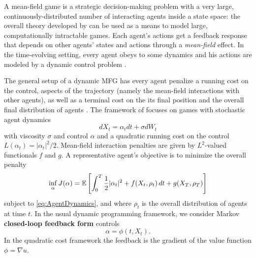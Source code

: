 \documentclass[../report.tex]{subfiles}
\begin{document}
A mean-field game \cite{LASRY2006619,LASRY2006679} is a strategic decision-making problem with a very large, continuously-distributed number of interacting agents inside a state space: the overall theory developed by \citeauthor{LASRY2006619} can be used as a means to model large, computationally intractable games. Each agent's actions get a feedback response that depends on other agents' states and actions through a \textit{mean-field} effect. In the time-evolving setting, every agent obeys to some dynamics and his actions are modeled by a dynamic control problem \cite{LASRY2006679}.

The general setup of a dynamic MFG has every agent penalize a running cost on the control, aspects of the trajectory (namely the mean-field interactions with other agents), as well as a terminal cost on the its final position and the overall final distribution of agents \cite{LASRY2006679}.
The framework of \cites{benamou:hal-01295299}{benamou2018entropy} focuses on games with stochastic agent dynamics 
\begin{equation}\label{eq:AgentDynamics}
dX_t = \alpha_tdt + \sigma dW_t
\end{equation}
with viscosity $\sigma$ and control $\alpha$ and a quadratic running cost on the control $L(\alpha_t) = |\alpha_t|^2/2$. Mean-field interaction penalties are given by $L^2$-valued functionals $f$ and $g$. A representative agent's objective is to minimize the overall penalty
\begin{equation}
\inf_{\alpha} J(\alpha) = \mathbb{E}\left[
\int_0^T \frac{1}{2}|\alpha_t|^2 + f(X_t, \rho_t) \,dt
+ g(X_T, \rho_T)
\right]
\end{equation}
subject to \cref{eq:AgentDynamics}, and where $\rho_t$ is the overall distribution of agents at time $t$. In the usual dynamic programming framework, we consider Markov \textbf{closed-loop feedback form} controls
\begin{equation}
	\alpha = \phi(t, X_t).
\end{equation}
In the quadratic cost framework the feedback is the gradient of the value function $\phi = \nabla u$.
\end{document}

